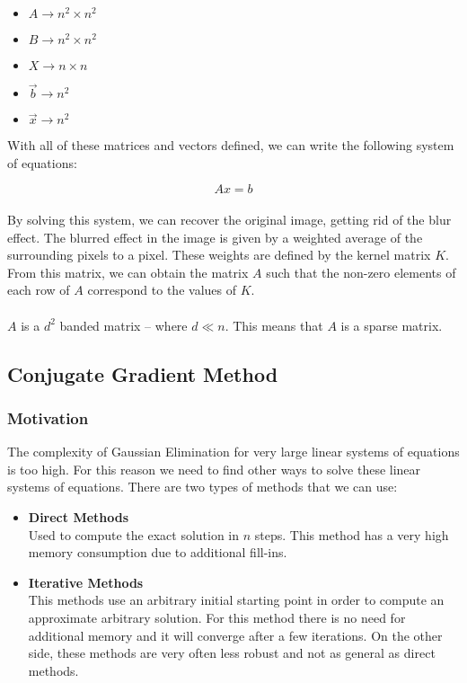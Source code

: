 \documentclass{article}
\begin{document}
\begin{itemize}
	\item $A \rightarrow n^2 \times n^2$
	\item $B \rightarrow n^2 \times n^2$
	\item $X \rightarrow n \times n$
	\item $\overrightarrow{b} \rightarrow n^2$
	\item $\overrightarrow{x} \rightarrow n^2$
\end{itemize}
With all of these matrices and vectors defined, we can write the following system of equations:

\[ Ax = b \] \\
By solving this system, we can recover the original image, getting rid of the blur effect. The blurred effect in the image is given by a weighted average of the surrounding pixels to a pixel. These weights are defined by the kernel matrix $K$. From this matrix, we can obtain the matrix $A$ such that the non-zero elements of each row of $A$ correspond to the values of $K$. \\ \\
$A$ is a $d^2$ banded matrix -- where $d \ll n$. This means that $A$ is a sparse matrix.

\subsection{Conjugate Gradient Method}
\subsubsection{Motivation}
The complexity of Gaussian Elimination for very large linear systems of equations is too high. For this reason we need to find other ways to solve these linear systems of equations. There are two types of methods that we can use:

\begin{itemize}
	\item \textbf{Direct Methods}
	\vspace{.2cm} \\
	Used to compute the exact solution in $n$ steps. This method has a very high memory consumption due to additional fill-ins.
	
	\item \textbf{Iterative Methods}
	\vspace{.2cm} \\
	This methods use an arbitrary initial starting point in order to compute an approximate arbitrary solution. For this method there is no need for additional memory and it will converge after a few iterations. On the other side, these methods are very often less robust and not as general as direct methods.
\end{itemize}
\end{document}
